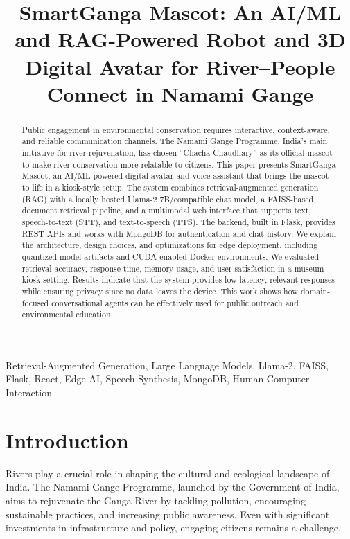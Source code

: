 \documentclass[conference]{IEEEtran}
\begin{document}
\title{SmartGanga Mascot: An AI/ML and RAG-Powered Robot and 3D Digital Avatar for River--People Connect in Namami Gange}

\author{%
}

\maketitle

\begin{abstract}
Public engagement in environmental conservation requires interactive, context-aware, and reliable communication channels. The Namami Gange Programme, India’s main initiative for river rejuvenation, has chosen ``Chacha Chaudhary'' as its official mascot to make river conservation more relatable to citizens. This paper presents SmartGanga Mascot, an AI/ML-powered digital avatar and voice assistant that brings the mascot to life in a kiosk-style setup. The system combines retrieval-augmented generation (RAG) with a locally hosted Llama-2 7B/compatible chat model, a FAISS-based document retrieval pipeline, and a multimodal web interface that supports text, speech-to-text (STT), and text-to-speech (TTS). The backend, built in Flask, provides REST APIs and works with MongoDB for authentication and chat history. We explain the architecture, design choices, and optimizations for edge deployment, including quantized model artifacts and CUDA-enabled Docker environments. We evaluated retrieval accuracy, response time, memory usage, and user satisfaction in a museum kiosk setting. Results indicate that the system provides low-latency, relevant responses while ensuring privacy since no data leaves the device. This work shows how domain-focused conversational agents can be effectively used for public outreach and environmental education.
\end{abstract}

\begin{IEEEkeywords}
Retrieval-Augmented Generation, Large Language Models, Llama-2, FAISS, Flask, React, Edge AI, Speech Synthesis, MongoDB, Human-Computer Interaction
\end{IEEEkeywords}

\section{Introduction}
Rivers play a crucial role in shaping the cultural and ecological landscape of India. The Namami Gange Programme, launched by the Government of India, aims to rejuvenate the Ganga River by tackling pollution, encouraging sustainable practices, and increasing public awareness. Even with significant investments in infrastructure and policy, engaging citizens remains a challenge.
\end{document}
